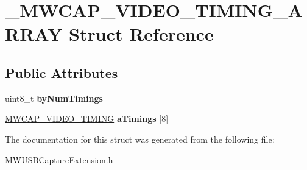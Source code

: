 \hypertarget{struct__MWCAP__VIDEO__TIMING__ARRAY}{\section{\-\_\-\-M\-W\-C\-A\-P\-\_\-\-V\-I\-D\-E\-O\-\_\-\-T\-I\-M\-I\-N\-G\-\_\-\-A\-R\-R\-A\-Y Struct Reference}
\label{struct__MWCAP__VIDEO__TIMING__ARRAY}
}
\subsection*{Public Attributes}
\begin{DoxyCompactItemize}
\item 
\hypertarget{struct__MWCAP__VIDEO__TIMING__ARRAY_a49d43b6064b5676ad12a494a3346755e}{uint8\-\_\-t {\bfseries by\-Num\-Timings}}\label{struct__MWCAP__VIDEO__TIMING__ARRAY_a49d43b6064b5676ad12a494a3346755e}

\item 
\hypertarget{struct__MWCAP__VIDEO__TIMING__ARRAY_ab19d3955bf1a06dd8827e1c7894e8e73}{\hyperlink{struct__MWCAP__VIDEO__TIMING}{M\-W\-C\-A\-P\-\_\-\-V\-I\-D\-E\-O\-\_\-\-T\-I\-M\-I\-N\-G} {\bfseries a\-Timings} \mbox{[}8\mbox{]}}\label{struct__MWCAP__VIDEO__TIMING__ARRAY_ab19d3955bf1a06dd8827e1c7894e8e73}

\end{DoxyCompactItemize}


The documentation for this struct was generated from the following file\-:\begin{DoxyCompactItemize}
\item 
M\-W\-U\-S\-B\-Capture\-Extension.\-h\end{DoxyCompactItemize}
